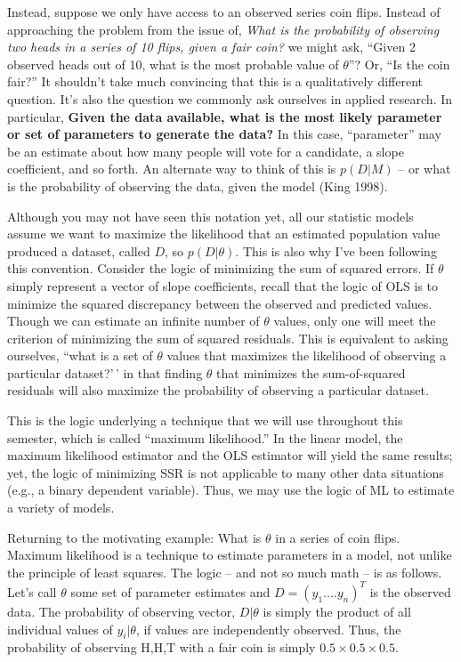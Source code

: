 \documentclass[
]{book}
\begin{document}
Instead, suppose we only have access to an observed series coin flips. Instead of approaching the problem from the issue of, \emph{What is the probability of observing two heads in a series of 10 flips, given a fair coin?} we might ask, ``Given 2 observed heads out of 10, what is the most probable value of \(\theta\)''? Or, ``Is the coin fair?'' It shouldn't take much convincing that this is a qualitatively different question. It's also the question we commonly ask ourselves in applied research. In particular, \textbf{Given the data available, what is the most likely parameter or set of parameters to generate the data?} In this case, ``parameter'' may be an estimate about how many people will vote for a candidate, a slope coefficient, and so forth. An alternate way to think of this is \(p(D|M)\) -- or what is the probability of observing the data, given the model (King 1998).

Although you may not have seen this notation yet, all our statistic models assume we want to maximize the likelihood that an estimated population value produced a dataset, called \(D\), so \(p(D | \theta)\). This is also why I've been following this convention. Consider the logic of minimizing the sum of squared errors. If \(\theta\) simply represent a vector of slope coefficients, recall that the logic of OLS is to minimize the squared discrepancy between the observed and predicted values. Though we can estimate an infinite number of \(\theta\) values, only one will meet the criterion of minimizing the sum of squared residuals. This is equivalent to asking ourselves, ``what is a set of \(\theta\) values that maximizes the likelihood of observing a particular dataset?'\,' in that finding \(\theta\) that minimizes the sum-of-squared residuals will also maximize the probability of observing a particular dataset.

This is the logic underlying a technique that we will use throughout this semester, which is called ``maximum likelihood.'' In the linear model, the maximum likelihood estimator and the OLS estimator will yield the same results; yet, the logic of minimizing SSR is not applicable to many other data situations (e.g., a binary dependent variable). Thus, we may use the logic of ML to estimate a variety of models.

Returning to the motivating example: What is \(\theta\) in a series of coin flips. Maximum likelihood is a technique to estimate parameters in a model, not unlike the principle of least squares. The logic -- and not so much math -- is as follows. Let's call \(\theta\) some set of parameter estimates and \(D=(y_1....y_n)^T\) is the observed data. The probability of observing vector, \(D|\theta\) is simply the product of all individual values of \(y_i | \theta\), if values are independently observed. Thus, the probability of observing H,H,T with a fair coin is simply \(0.5 \times 0.5 \times 0.5\).
\end{document}
